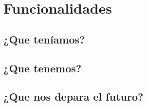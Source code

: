 \section{Funcionalidades}
	\subsection{¿Que teníamos?} %
	\subsection{¿Que tenemos?} %
	\subsection{¿Que nos depara el futuro?} %